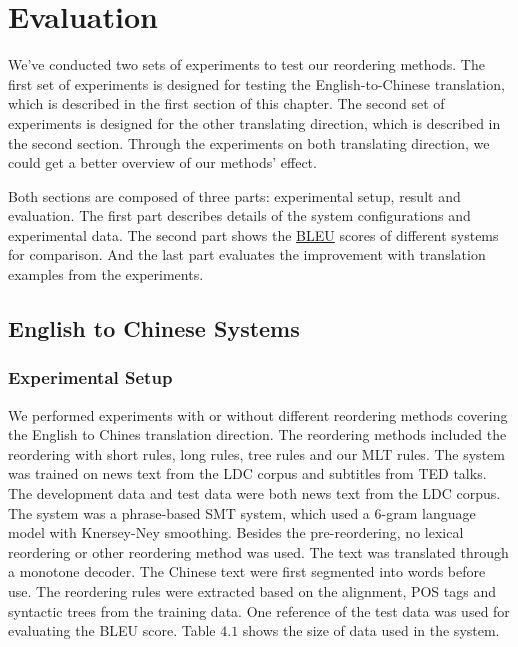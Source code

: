
\chapter{Evaluation}
\label{ch:Evaluation}

We've conducted two sets of experiments to test our reordering methods. The first set of experiments is designed for testing the English-to-Chinese translation, which is described in the first section of this chapter. The second set of experiments is designed for the other translating direction, which is described in the second section. Through the experiments on both translating direction, we could get a better overview of our methods' effect.

Both sections are composed of three parts: experimental setup, result and evaluation. The first part describes details of the system configurations and experimental data. The second part shows the \hyperref[ch:Foundations:sec:bleu]{BLEU} scores of different systems for comparison. And the last part evaluates the improvement with translation examples from the experiments.


\section{English to Chinese Systems}
\label{ch:Evaluation:sec:enw}

\subsection{Experimental Setup}
We performed experiments with or without different reordering methods covering the English to Chines translation direction. The reordering methods included the reordering with short rules, long rules, tree rules and our MLT rules. The system was trained on news text from the LDC corpus and subtitles from TED talks. The development data and test data were both news text from the LDC corpus. The system was a phrase-based SMT system, which used a 6-gram language model with Knersey-Ney smoothing. Besides the pre-reordering, no lexical reordering or other reordering method was used. The text was translated through a monotone decoder. The Chinese text were first segmented into words before use.
The reordering rules were extracted based on the alignment, POS tags and syntactic trees from the training data. One reference of the test data was used for evaluating the BLEU score. Table $4.1$ shows the size of data used in the system. %

